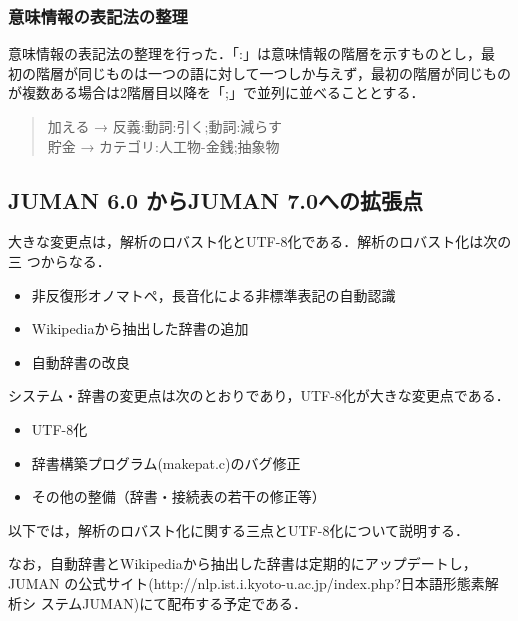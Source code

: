 \documentclass[a4j,titlepage]{jarticle}
\begin{document}
\subsubsection{意味情報の表記法の整理}

意味情報の表記法の整理を行った．「:」は意味情報の階層を示すものとし，最
初の階層が同じものは一つの語に対して一つしか与えず，最初の階層が同じもの
が複数ある場合は2階層目以降を「;」で並列に並べることとする．

\begin{quote}
 加える → 反義:動詞:引く;動詞:減らす \\
 貯金 → カテゴリ:人工物-金銭;抽象物 \\
\end{quote}


\subsection{JUMAN 6.0 からJUMAN 7.0への拡張点}
\label{subsec:7.0}

大きな変更点は，解析のロバスト化とUTF-8化である．解析のロバスト化は次の三
つからなる．

\begin{itemize}
\item 非反復形オノマトペ，長音化による非標準表記の自動認識
\item Wikipediaから抽出した辞書の追加
\item 自動辞書の改良
\end{itemize}

システム・辞書の変更点は次のとおりであり，UTF-8化が大きな変更点である．
\begin{itemize}
\item UTF-8化
\item 辞書構築プログラム(makepat.c)のバグ修正
\item その他の整備（辞書・接続表の若干の修正等）
\end{itemize}

以下では，解析のロバスト化に関する三点とUTF-8化について説明する．

なお，自動辞書とWikipediaから抽出した辞書は定期的にアップデートし，JUMAN
の公式サイト(http://nlp.ist.i.kyoto-u.ac.jp/index.php?日本語形態素解析シ
ステムJUMAN)にて配布する予定である．


\end{document}
